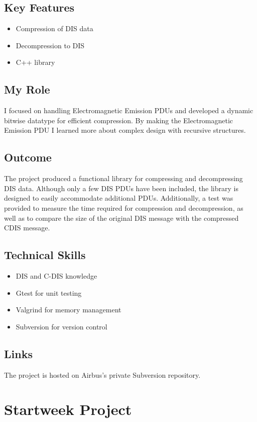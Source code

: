 \documentclass{article}
\begin{document}
\subsection{Key Features}
\begin{itemize}
    \item Compression of DIS data
    \item Decompression to DIS
    \item C++ library
\end{itemize}

\subsection{My Role}
I focused on handling Electromagnetic Emission PDUs and developed a dynamic bitwise datatype for efficient compression.
By making the Electromagnetic Emission PDU I learned more about complex design with recursive structures.

\subsection{Outcome}
The project produced a functional library for compressing and decompressing DIS data. Although only a few DIS PDUs have been included, the library is designed to easily accommodate additional PDUs. Additionally, a test was provided to measure the time required for compression and decompression, as well as to compare the size of the original DIS message with the compressed CDIS message.
\subsection{Technical Skills}
\begin{itemize}
    \item DIS and C-DIS knowledge
    \item Gtest for unit testing
    \item Valgrind for memory management
    \item Subversion for version control
\end{itemize}

\subsection{Links}
The project is hosted on Airbus's private Subversion repository.

\section{Startweek Project}
\end{document}

